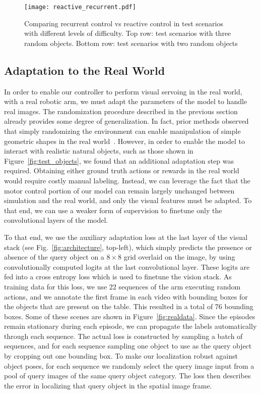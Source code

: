 \documentclass[10pt,twocolumn,letterpaper]{article}
\begin{document}
\begin{figure*}[t]
\begin{center}
\texttt{[image: reactive\_recurrent.pdf]}
\end{center}
\vspace{-.15in}
   \caption{Comparing recurrent control vs reactive control in test scenarios with different levels of difficulty. Top row: test scenarios with three random objects. Bottom row: test scenarios with two random objects}
\label{fig:recurrentvsff}
\vspace{-.15in}
\end{figure*}\subsection{Adaptation to the Real World}
In order to enable our controller to perform visual servoing in the real world, with a real robotic arm, we must adapt the parameters of the model to handle real images. The randomization procedure described in the previous section already provides some degree of generalization. In fact, prior methods observed that simply randomizing the environment can enable manipulation of simple geometric shapes in the real world~\cite{tobin2017domain}. However, in order to enable the model to interact with realistic natural objects, such as those shown in Figure~\ref{fig:test_objects}, we found that an additional adaptation step was required. Obtaining either ground truth actions or rewards in the real world would require costly manual labeling. Instead, we can leverage the fact that the motor control portion of our model can remain largely unchanged between simulation and the real world, and only the visual features must be adapted. To that end, we can use a weaker form of supervision to finetune only the convolutional layers of the model.

To that end, we use the auxiliary adaptation loss at the last layer of the visual stack (see Fig.~\ref{fig:architecture}, top-left), which simply predicts the presence or absence of the query object on a $8 \times 8$ grid overlaid on the image, by using convolutionally computed logits at the last convolutional layer. These logits are fed into a cross entropy loss which is used to finetune the vision stack. As training data for this loss, we use 22 sequences of the arm executing random actions, and we annotate the first frame in each video with bounding boxes for the objects that are present on the table. This resulted in a total of 76 bounding boxes. Some of these scenes are shown in Figure~\ref{fig:realdata}. Since the episodes remain stationary during each episode, we can propagate the labels automatically through each sequence. The actual loss is constructed by sampling a batch of sequences, and for each sequence sampling one object to use as the query object by cropping out one bounding box. To make our localization robust against object poses, for each sequence we randomly select the query image input from a pool of query images of the same query object category. The loss then describes the error in localizing that query object in the spatial image frame.
\end{document}
